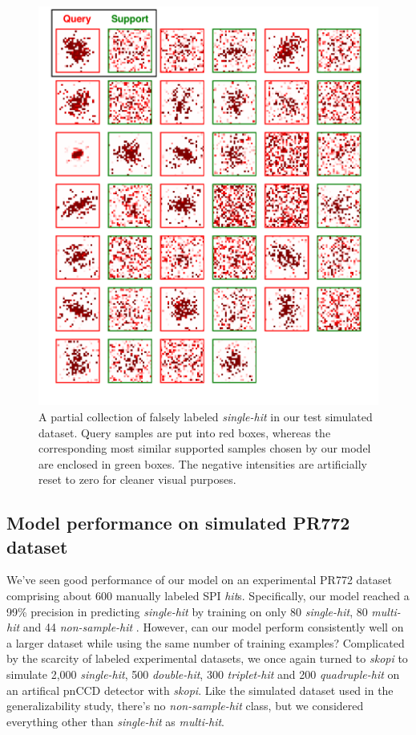 \begin{figure}
\includegraphics[width=\textwidth,height=0.8\textheight,keepaspectratio]
{figures/false_label.single.simulated.pdf}

\caption{A partial collection of falsely labeled \textit{single-hit} in our test
simulated dataset.  Query samples are put into red boxes, whereas the
corresponding most similar supported samples chosen by our model are enclosed
in green boxes.  The negative intensities are artificially reset to zero for
cleaner visual purposes.  }

\label{fig : false single simulated}
\end{figure}


\subsection{Model performance on simulated PR772 dataset}

We've seen good performance of our model on an experimental PR772 dataset
comprising about 600 manually labeled SPI \textit{hit}s.  Specifically, our
model reached a 99\% precision in predicting \textit{single-hit} by training on
only 80 \textit{single-hit}, 80 \textit{multi-hit} and 44 \textit{non-sample-hit}
.  However, can our model perform consistently well on a larger dataset while
using the same number of training examples?  Complicated by the scarcity of
labeled experimental datasets, we once again turned to \textit{skopi} to
simulate 2,000 \textit{single-hit}, 500 \textit{double-hit}, 300
\textit{triplet-hit} and 200 \textit{quadruple-hit} on an artifical pnCCD
detector with \textit{skopi}.  Like the simulated dataset used in the
generalizability study, there's no \textit{non-sample-hit} class, but we
considered everything other than \textit{single-hit} as \textit{multi-hit}.  

